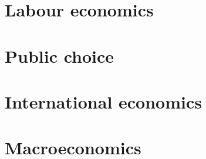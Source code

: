 \documentclass[oneside]{book}
\begin{document}
\part{Labour economics}



\part{Public choice}









\part{International economics}



\part{Macroeconomics}




\end{document}
